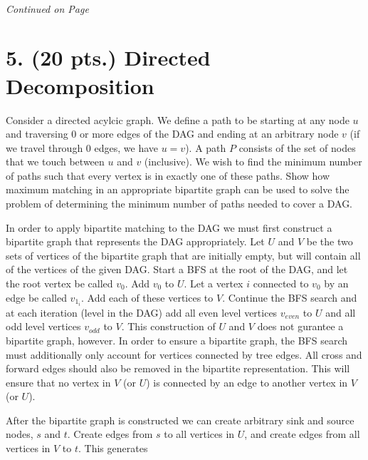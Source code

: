 \documentclass[11pt]{article}
\begin{document}
\paragraph{} \emph{Continued on Page \pageref{pg:p4-continuation}}

\newpage

\section*{5. (20 pts.) Directed Decomposition}

Consider a directed acylcic graph. We define a path to be starting at any 
node $u$ and traversing $0$ or more edges of the DAG and ending at an arbitrary 
node $v$ (if we travel through $0$ edges, we have $u = v$). A path $P$ 
consists of the set of nodes that we touch between $u$ and $v$ (inclusive). 
We wish to find the minimum number of paths such that every vertex is in 
exactly one of these paths. Show how maximum matching in an appropriate 
bipartite graph can be used to solve the problem of determining the 
minimum number of paths needed to cover a DAG.

In order to apply bipartite matching to the DAG we must first construct a 
bipartite graph that represents the DAG appropriately. Let $U$ and $V$ 
be the two sets of vertices of the bipartite graph that are initially empty, but will contain
all of the vertices of the given DAG. Start a BFS at the root of the DAG, 
and let the root vertex be called $v_0$. Add $v_0$ to $U$. Let a vertex $i$
connected to $v_0$ by an edge be called $v_{1_i}$. Add each of these vertices 
to $V$. Continue the BFS search and at each iteration (level in the DAG)
add all even level vertices $v_{even}$ to $U$ and all odd level vertices $v_{odd}$ to $V$.
This construction of $U$ and $V$ does not gurantee a bipartite graph, however. 
In order to ensure a bipartite graph, the BFS search must additionally 
only account for vertices connected by tree edges. All cross and forward 
edges should also be removed in the bipartite representation. 
This will ensure that no 
vertex in $V$ (or $U$) is connected by an edge to another vertex in $V$ (or $U$).

After the bipartite graph is constructed we can create arbitrary sink and source 
nodes, $s$ and $t$. Create edges from $s$ to all vertices in $U$, and create 
edges from all vertices in $V$ to $t$. This generates   


\label{pg:end-of-p5}


%
\end{document}
